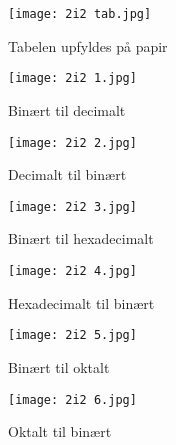 \documentclass{article}
\begin{document}
\begin{figure}[h!]
\begin{center}
\texttt{[image: 2i2 tab.jpg]}
\caption*{Tabelen upfyldes på papir}
\end{center}
\end{figure}

\begin{figure}[h!]
\begin{center}
\texttt{[image: 2i2 1.jpg]}
\caption*{Binært til decimalt}
\end{center}
\end{figure}

\begin{figure}[h!]
\begin{center}
\texttt{[image: 2i2 2.jpg]}
\caption*{Decimalt til binært}

\end{center}
\end{figure}

\begin{figure}[h!]
\begin{center}
\texttt{[image: 2i2 3.jpg]}
\caption*{Binært til hexadecimalt}
\end{center}
\end{figure}

\begin{figure}[h!]
\begin{center}
\texttt{[image: 2i2 4.jpg]}
\caption*{Hexadecimalt til binært}
\end{center}
\end{figure}

\begin{figure}[h!]
\begin{center}
\texttt{[image: 2i2 5.jpg]}
\caption*{Binært til oktalt}
\end{center}
\end{figure}

\begin{figure}[h!]
\begin{center}
\texttt{[image: 2i2 6.jpg]}
\caption*{Oktalt til binært}
\end{center}
\end{figure}
\end{document}
